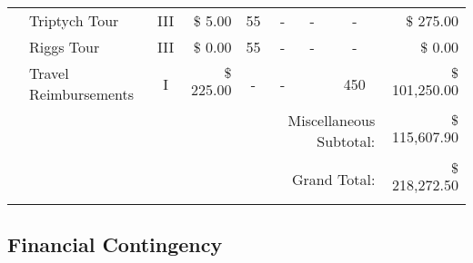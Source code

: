 \begin{table}[h]
{\begin{tabular}{|clcrccccr|}
     & Triptych Tour             & III                       & $\$$ 5.00                 & 55                        &     -                    &     -                     &     -                     & $\$$ 275.00               \\
     & Riggs Tour                & III                       & $\$$ 0.00                 & 55                        &     -                    &     -                     &     -                     & $\$$ 0.00                 \\
     & Travel Reimbursements     & I                         & $\$$ 225.00               &  -                        &     -                    &                           &  450                      & $\$$ 101,250.00           \\ \hline
     &                           &                           &                           &                           &\multicolumn{3}{r}{Miscellaneous Subtotal:}                                       & $\$$ 115,607.90           \\ \hline\hline
     &                           &                           &                           &                           &                          &                           &                           &                           \\
     &                           &                           &                           &                           &\multicolumn{3}{r}{Grand Total:}                                                  & $\$$218,272.50            \\
     &                           &                           &                           &                           &                          &                           &                           &                           \\ \hline
\end{tabular}}
\end{table}

\subsection{Financial Contingency}


\begin{table}[H]
    \caption{Budget Cuts}
    \label{table:cuts}
    \centering
\end{table}

